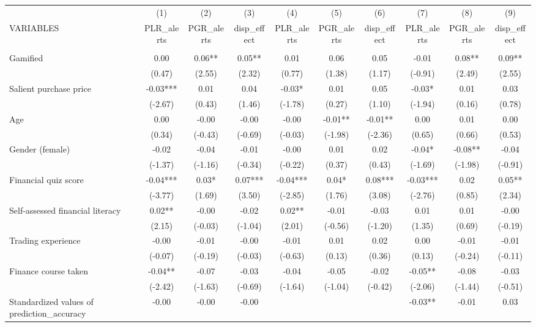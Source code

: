 \documentclass[]{article}
\begin{document}
\begin{tabular}{lccccccccc} \hline
 & (1) & (2) & (3) & (4) & (5) & (6) & (7) & (8) & (9) \\
VARIABLES & PLR\_alerts & PGR\_alerts & disp\_effect & PLR\_alerts & PGR\_alerts & disp\_effect & PLR\_alerts & PGR\_alerts & disp\_effect \\ \hline
 &  &  &  &  &  &  &  &  &  \\
Gamified & 0.00 & 0.06** & 0.05** & 0.01 & 0.06 & 0.05 & -0.01 & 0.08** & 0.09** \\
 & (0.47) & (2.55) & (2.32) & (0.77) & (1.38) & (1.17) & (-0.91) & (2.49) & (2.55) \\
Salient purchase price & -0.03*** & 0.01 & 0.04 & -0.03* & 0.01 & 0.05 & -0.03* & 0.01 & 0.03 \\
 & (-2.67) & (0.43) & (1.46) & (-1.78) & (0.27) & (1.10) & (-1.94) & (0.16) & (0.78) \\
Age & 0.00 & -0.00 & -0.00 & -0.00 & -0.01** & -0.01** & 0.00 & 0.01 & 0.00 \\
 & (0.34) & (-0.43) & (-0.69) & (-0.03) & (-1.98) & (-2.36) & (0.65) & (0.66) & (0.53) \\
Gender (female) & -0.02 & -0.04 & -0.01 & -0.00 & 0.01 & 0.02 & -0.04* & -0.08** & -0.04 \\
 & (-1.37) & (-1.16) & (-0.34) & (-0.22) & (0.37) & (0.43) & (-1.69) & (-1.98) & (-0.91) \\
Financial quiz score & -0.04*** & 0.03* & 0.07*** & -0.04*** & 0.04* & 0.08*** & -0.03*** & 0.02 & 0.05** \\
 & (-3.77) & (1.69) & (3.50) & (-2.85) & (1.76) & (3.08) & (-2.76) & (0.85) & (2.34) \\
Self-assessed financial literacy & 0.02** & -0.00 & -0.02 & 0.02** & -0.01 & -0.03 & 0.01 & 0.01 & -0.00 \\
 & (2.15) & (-0.03) & (-1.04) & (2.01) & (-0.56) & (-1.20) & (1.35) & (0.69) & (-0.19) \\
Trading experience & -0.00 & -0.01 & -0.00 & -0.01 & 0.01 & 0.02 & 0.00 & -0.01 & -0.01 \\
 & (-0.07) & (-0.19) & (-0.03) & (-0.63) & (0.13) & (0.36) & (0.13) & (-0.24) & (-0.11) \\
Finance course taken & -0.04** & -0.07 & -0.03 & -0.04 & -0.05 & -0.02 & -0.05** & -0.08 & -0.03 \\
 & (-2.42) & (-1.63) & (-0.69) & (-1.64) & (-1.04) & (-0.42) & (-2.06) & (-1.44) & (-0.51) \\
Standardized values of prediction\_accuracy & -0.00 & -0.00 & -0.00 &  &  &  & -0.03** & -0.01 & 0.03 \\

\end{tabular}
\end{document}
